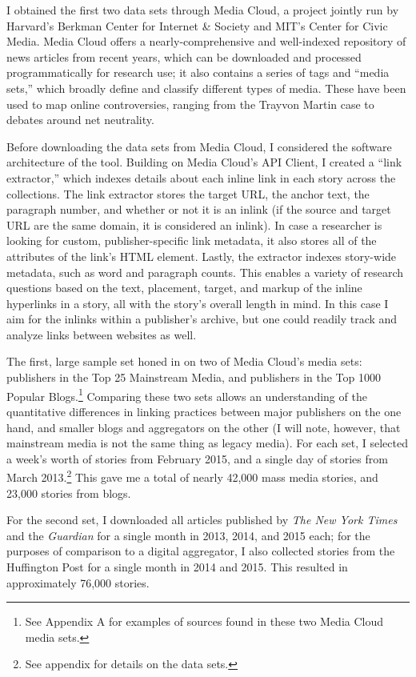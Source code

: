 \noindent I obtained the first two data sets through Media Cloud, a project jointly run by Harvard's Berkman Center for Internet \& Society and MIT's Center for Civic Media. Media Cloud offers a nearly-comprehensive and well-indexed repository of news articles from recent years, which can be downloaded and processed programmatically for research use; it also contains a series of tags and ``media sets,'' which broadly define and classify different types of media. These have been used to map online controversies, ranging from the Trayvon Martin case to debates around net neutrality.\autocites[See][]{benkler_social_2013}{graeff_battle_2014}

Before downloading the data sets from Media Cloud, I considered the software architecture of the tool. Building on Media Cloud's API Client, I created a ``link extractor,'' which indexes details about each inline link in each story across the collections. The link extractor stores the target URL, the anchor text, the paragraph number, and whether or not it is an inlink (if the source and target URL are the same domain, it is considered an inlink). In case a researcher is looking for custom, publisher-specific link metadata, it also stores all of the attributes of the link's HTML element. Lastly, the extractor indexes story-wide metadata, such as word and paragraph counts. This enables a variety of research questions based on the text, placement, target, and markup of the inline hyperlinks in a story, all with the story's overall length in mind. In this case I aim for the inlinks within a publisher's archive, but one could readily track and analyze links between websites as well.

The first, large sample set honed in on two of Media Cloud's media sets: publishers in the Top 25 Mainstream Media, and publishers in the Top 1000 Popular Blogs.\footnote{See Appendix A for examples of sources found in these two Media Cloud media sets.} Comparing these two sets allows an understanding of the quantitative differences in linking practices between major publishers on the one hand, and smaller blogs and aggregators on the other (I will note, however, that mainstream media is not the same thing as legacy media). For each set, I selected a week's worth of stories from February 2015, and a single day of stories from March 2013.\footnote{See appendix for details on the data sets.} This gave me a total of nearly 42,000 mass media stories, and 23,000 stories from blogs.

For the second set, I downloaded all articles published by \emph{The New York Times} and the \emph{Guardian} for a single month in 2013, 2014, and 2015 each; for the purposes of comparison to a digital aggregator, I also collected stories from the Huffington Post for a single month in 2014 and 2015. This resulted in approximately 76,000 stories.

